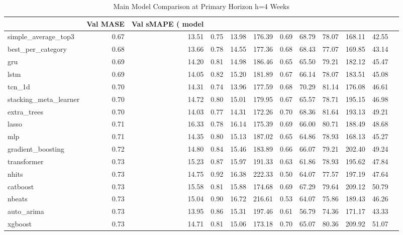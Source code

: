 \begin{table}
\caption{Main Model Comparison at Primary Horizon h=4 Weeks}
\begin{tabular}{lrrrrrrrrrr}
\toprule
 & Val MASE & Val sMAPE (%
model &  &  &  &  &  &  &  &  &  &  \\
\midrule
simple_average_top3 & 0.67 & 13.51 & 0.75 & 13.98 & 176.39 & 0.69 & 68.79 & 78.07 & 168.11 & 42.55 \\
best_per_category & 0.68 & 13.66 & 0.78 & 14.55 & 177.36 & 0.68 & 68.43 & 77.07 & 169.85 & 43.14 \\
gru & 0.69 & 14.20 & 0.81 & 14.98 & 186.46 & 0.65 & 65.50 & 79.21 & 182.12 & 45.47 \\
lstm & 0.69 & 14.05 & 0.82 & 15.20 & 181.89 & 0.67 & 66.14 & 78.07 & 183.51 & 45.08 \\
tcn_1d & 0.70 & 14.31 & 0.74 & 13.96 & 177.59 & 0.68 & 70.29 & 81.14 & 176.08 & 46.61 \\
stacking_meta_learner & 0.70 & 14.72 & 0.80 & 15.01 & 179.95 & 0.67 & 65.57 & 78.71 & 195.15 & 46.98 \\
extra_trees & 0.70 & 14.03 & 0.77 & 14.31 & 172.26 & 0.70 & 68.36 & 81.64 & 193.13 & 49.21 \\
lasso & 0.71 & 16.33 & 0.78 & 16.14 & 175.39 & 0.69 & 66.00 & 80.71 & 188.49 & 48.68 \\
mlp & 0.71 & 14.35 & 0.80 & 15.13 & 187.02 & 0.65 & 64.86 & 78.93 & 168.13 & 45.27 \\
gradient_boosting & 0.72 & 14.80 & 0.84 & 15.46 & 183.89 & 0.66 & 66.07 & 79.21 & 202.40 & 49.24 \\
transformer & 0.73 & 15.23 & 0.87 & 15.97 & 191.33 & 0.63 & 61.86 & 78.93 & 195.62 & 47.84 \\
nhits & 0.73 & 14.75 & 0.92 & 16.38 & 222.33 & 0.50 & 64.07 & 77.57 & 197.19 & 47.64 \\
catboost & 0.73 & 15.58 & 0.81 & 15.88 & 174.68 & 0.69 & 67.29 & 79.64 & 209.12 & 50.79 \\
nbeats & 0.73 & 15.04 & 0.90 & 16.72 & 216.61 & 0.53 & 64.07 & 75.86 & 189.43 & 46.26 \\
auto_arima & 0.73 & 13.95 & 0.86 & 15.31 & 197.46 & 0.61 & 56.79 & 74.36 & 171.17 & 43.33 \\
xgboost & 0.73 & 14.71 & 0.81 & 15.06 & 173.18 & 0.70 & 65.07 & 80.36 & 209.92 & 51.07 \\

\end{tabular}
\end{table}
